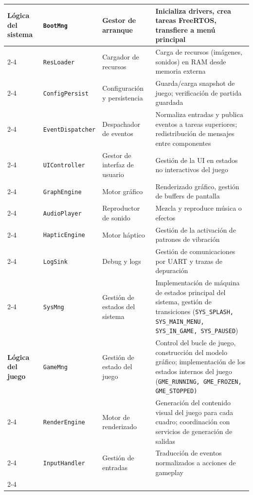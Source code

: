 \documentclass[11pt,a4paper]{article}
\begin{document}
\begin{longtable}{|p{2cm}|l|p{3cm}|p{6.5cm}|}
\textbf{Lógica del sistema} & \texttt{BootMng} & Gestor de arranque & Inicializa drivers, crea tareas FreeRTOS, transfiere a menú principal \\
\cline{2-4}
& \texttt{ResLoader} & Cargador de recursos & Carga de recursos (imágenes, sonidos) en RAM desde memoria externa \\
\cline{2-4}
& \texttt{ConfigPersist} & Configuración y persistencia & Guarda/carga snapshot de juego; verificación de partida guardada \\
\cline{2-4}
& \texttt{EventDispatcher} & Despachador de eventos & Normaliza entradas y publica eventos a tareas superiores; redistribución de mensajes entre componentes \\
\cline{2-4}
& \texttt{UIController} & Gestor de interfaz de usuario & Gestión de la UI en estados no interactivos del juego \\
\cline{2-4}
& \texttt{GraphEngine} & Motor gráfico & Renderizado gráfico, gestión de buffers de pantalla \\
\cline{2-4}
& \texttt{AudioPlayer} & Reproductor de sonido & Mezcla y reproduce música o efectos \\
\cline{2-4}
& \texttt{HapticEngine} & Motor háptico & Gestión de la activación de patrones de vibración \\
\cline{2-4}
& \texttt{LogSink} & Debug y logs & Gestión de comunicaciones por UART y trazas de depuración \\
\cline{2-4}
& \texttt{SysMng} & Gestión de estados del sistema & Implementación de máquina de estados principal del sistema,
gestión de transiciones (\texttt{SYS\_SPLASH, SYS\_MAIN\_MENU, SYS\_IN\_GAME, SYS\_PAUSED}) \\
\hline

\textbf{Lógica del juego} & \texttt{GameMng} & Gestión de estado del juego & Control del bucle de juego, construcción del modelo
gráfico; implementación de los estados internos del juego (\texttt{GME\_RUNNING, GME\_FROZEN, GME\_STOPPED)} \\
\cline{2-4}
& \texttt{RenderEngine} & Motor de renderizado & Generación del contenido visual del juego para cada cuadro; coordinación con servicios de generación de salidas \\
\cline{2-4}
& \texttt{InputHandler} & Gestión de entradas & Traducción de eventos normalizados a acciones de gameplay \\
\cline{2-4}
\end{longtable}


\end{document}
